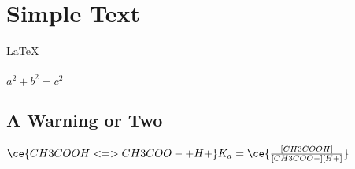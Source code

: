 \documentclass{article}
\begin{document}
 
 
\section{Simple Text}          %
\LaTeX \,\\ \\
 $a^2+b^2=c^2$


\subsection{A Warning or Two}  
$\ce{CH3COOH<=> CH3COO- +H+}\\
K_a=\ce{\frac{[CH3COOH]}{[CH3COO-][H+]}}$
\end{document}
